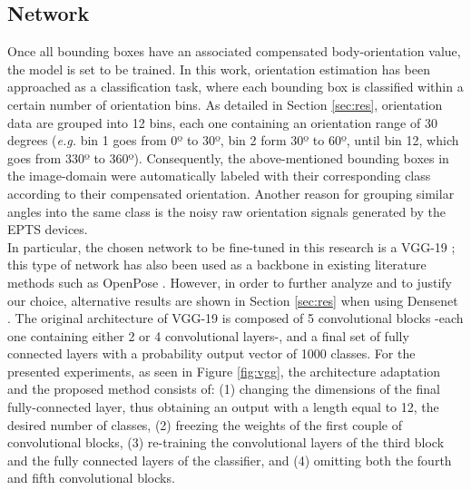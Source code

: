 \documentclass{article}
\newcommand{\cb}[2]{{\sout{#1}}{\color{cyan}#2}}
\begin{document}
\subsection{Network}
Once all bounding boxes have an associated compensated body-orientation value, the model is set to be trained. In this work, orientation estimation has been approached as a classification task, where each bounding box is classified within a certain number of orientation bins. 
As detailed in Section \ref{sec:res}, orientation data are grouped into 12 bins, each one containing an orientation range of 30 degrees (\textit{e.g.} bin 1 goes from 0º to 30º, bin 2 form 30º to 60º, until bin 12, which goes from 330º to 360º). Consequently, the above-mentioned bounding boxes in the image-domain were automatically labeled with their corresponding class according to their compensated orientation. Another reason for grouping similar angles into the same class is the noisy raw orientation signals generated by the EPTS devices. \\ 
In particular, the chosen network to be fine-tuned in this research is a VGG-19 \cite{simonyan2014very}; this type of network has also been used as a backbone in existing literature methods such as OpenPose \cite{cao2017realtime}. However, in order to further analyze and to justify our choice, alternative results are shown in Section \ref{sec:res} when using Densenet \cite{huang2017densely}. The original architecture of VGG-19 is composed of 5 convolutional blocks -each one containing either 2 or 4 convolutional layers-, and a final set of fully connected layers with a probability output vector of 1000 classes. For the presented experiments, as seen in Figure \ref{fig:vgg}, the architecture adaptation and the proposed method consists of: (1) changing the dimensions of the final fully-connected layer, thus obtaining an output with a length equal to 12, the desired number of classes, (2) freezing the weights of the first couple of convolutional blocks, (3) re-training the convolutional layers of the third block and the fully connected layers of the classifier, and (4) omitting both the fourth and fifth convolutional blocks.
\end{document}
